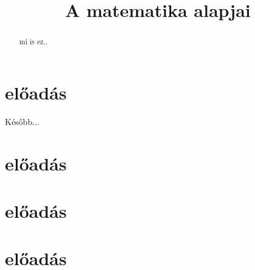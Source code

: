 \documentclass[a4paper]{amsart}
\begin{document}
\title{A matematika alapjai}
\begin{abstract}
mi is ez..
\end{abstract}
\maketitle
\section{előadás}
Később...
\section{előadás}

\section{előadás}

\section{előadás}

\end{document}
